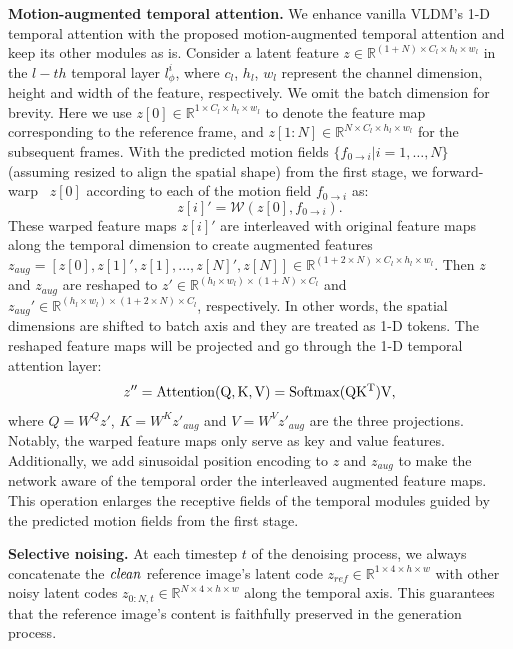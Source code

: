 \documentclass[10pt,twocolumn,letterpaper]{article}
\begin{document}
\noindent \textbf{Motion-augmented temporal attention.} We enhance vanilla VLDM's 1-D temporal attention with the proposed motion-augmented temporal attention and keep its other modules as is. Consider a latent feature $z\in \mathbb{R}^{(1+N) \times C_l \times h_l\times w_l}$ in the $l-th$ temporal layer $l^i_\phi$, where $c_l$, $h_l$, $w_l$ represent the channel dimension, height and width of the feature, respectively. We omit the batch dimension for brevity. Here we use $z[0] \in \mathbb{R}^{1 \times C_l \times h_l\times w_l}$ to denote the feature map corresponding to the reference frame, and $z[1:N] \in \mathbb{R}^{N \times C_l \times h_l\times w_l}$ for the subsequent frames. With the predicted motion fields $\{f_{0 \rightarrow i} | i=1,\dots,N\}$ (assuming resized to align the spatial shape) from the first stage, we forward-warp~\cite{niklaus2020softmax} $z[0]$ according to each of the motion field $f_{0\rightarrow i}$ as:
\begin{equation}
    z[i]'=\mathcal{W}(z[0], f_{0\rightarrow i}).
\end{equation}
These warped feature maps $z[i]'$ are interleaved with original feature maps along the temporal dimension to create augmented features $z_{aug}=[z[0], z[1]', z[1],...,z[N]', z[N]]\in \mathbb{R}^{(1+2\times N) \times C_l \times h_l\times w_l}$. Then $z$ and $z_{aug}$ are reshaped to $z' \in \mathbb{R}^{(h_l\times w_l) \times (1+N) \times C_l}$ and $z_{aug}'\in \mathbb{R}^{(h_l\times w_l) \times (1+2\times N) \times C_l}$, respectively. In other words, the spatial dimensions are shifted to batch axis and they are treated as 1-D tokens. The reshaped feature maps will be projected and go through the 1-D temporal attention layer:
\begin{equation}
    z'' = \rm{Attention}(Q,K,V)=\rm{Softmax}(QK^T)V,
\end{equation} \label{soft-inject}
where $Q=W^Qz'$, $K=W^Kz'_{aug}$ and $V=W^Vz'_{aug}$ are the three projections. Notably, the warped feature maps only serve as key and value features. Additionally, we add sinusoidal position encoding to $z$ and $z_{aug}$ to make the network aware of the temporal order the interleaved augmented feature maps. This operation enlarges the receptive fields of the temporal modules guided by the predicted motion fields from the first stage.

\noindent \textbf{Selective noising.} At each timestep $t$ of the denoising process, we always concatenate the $\it{clean}$ reference image's latent code $z_{ref} \in \mathbb{R}^{1 \times 4 \times h\times w}$ with other noisy latent codes $z_{0:N,t} \in \mathbb{R}^{N \times 4 \times h\times w}$ along the temporal axis. This guarantees that the reference image's content is faithfully preserved in the generation process.
\end{document}
